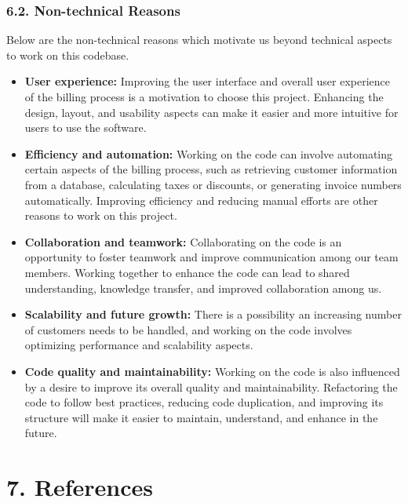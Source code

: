 \documentclass[12pt,letterpaper]{report}
\begin{document}
\newpage
{}
\subsubsection*{6.2. Non-technical Reasons}
\normalsize {Below are the non-technical reasons which motivate us  beyond technical aspects to work on this codebase.}

\begin{itemize}
    \item \textbf{User experience: }Improving the user interface and overall user experience of the billing process is a motivation to choose this project. Enhancing the design, layout, and usability aspects can make it easier and more intuitive for users to use the software.
    \item \textbf{Efficiency and automation:} Working on the code can involve automating certain aspects of the billing process, such as retrieving customer information from a database, calculating taxes or discounts, or generating invoice numbers automatically. Improving efficiency and reducing manual efforts are other reasons to work on this project.
    \item \textbf{Collaboration and teamwork:} Collaborating on the code is an opportunity to foster teamwork and improve communication among our team members. Working together to enhance the code can lead to shared understanding, knowledge transfer, and improved collaboration among us.
    \item \textbf{Scalability and future growth:} There is a possibility an increasing number of customers needs to be handled, and working on the code involves optimizing performance and scalability aspects.
    \item     \textbf{Code quality and maintainability:} Working on the code is also influenced by a desire to improve its overall quality and maintainability. Refactoring the code to follow best practices, reducing code duplication, and improving its structure will make it easier to maintain, understand, and enhance in the future.
\end{itemize}

\clearpage
{}
\section*{7. References}
\end{document}
